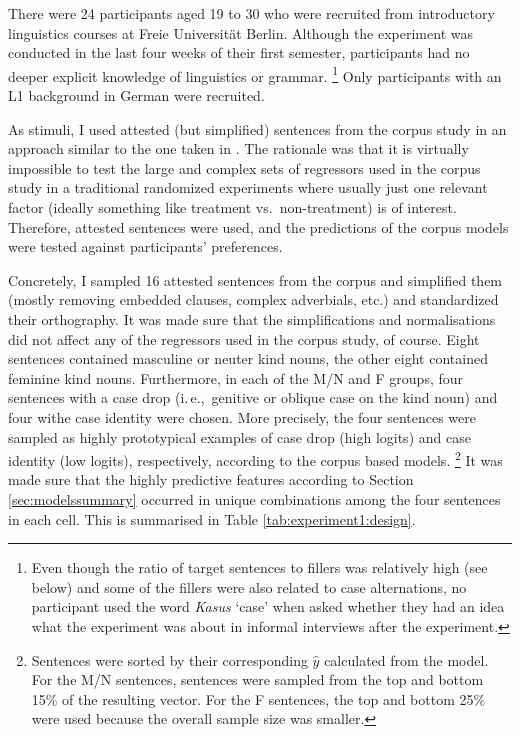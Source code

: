 \documentclass[USenglish]{article}
\newcommand{\ie}{i.\,e.,}
\begin{document}
There were 24 participants aged 19 to 30 who were recruited from introductory linguistics courses at Freie Universität Berlin.
Although the experiment was conducted in the last four weeks of their first semester, participants had no deeper explicit knowledge of linguistics or grammar.%
\footnote{Even though the ratio of target sentences to fillers was relatively high (see below) and some of the fillers were also related to case alternations, no participant used the word \textit{Kasus} `case' when asked whether they had an idea what the experiment was about in informal interviews after the experiment.}
Only participants with an L1 background in German were recruited.

As stimuli, I used attested (but simplified) sentences from the corpus study in an approach similar to the one taken in \cite{DivjakEa2016}.
The rationale was that it is virtually impossible to test the large and complex sets of regressors used in the corpus study in a traditional randomized experiments where usually just one relevant factor (ideally something like treatment vs.\ non-treatment) is of interest.
Therefore, attested sentences were used, and the predictions of the corpus models were tested against participants' preferences.

Concretely, I sampled 16 attested sentences from the corpus and simplified them (mostly removing embedded clauses, complex adverbials, etc.) and standardized their orthography.
It was made sure that the simplifications and normalisations did not affect any of the regressors used in the corpus study, of course.
Eight sentences contained masculine or neuter kind nouns, the other eight contained feminine kind nouns.
Furthermore, in each of the M\slash N and F groups, four sentences with a case drop (\ie\ genitive or oblique case on the kind noun) and four withe case identity were chosen.
More precisely, the four sentences were sampled as highly prototypical examples of case drop (high logits) and case identity (low logits), respectively, according to the corpus based models.%
\footnote{Sentences were sorted by their corresponding $\hat{y}$ calculated from the model.
For the M\slash N sentences, sentences were sampled from the top and bottom 15\% of the resulting vector.
For the F sentences, the top and bottom 25\% were used because the overall sample size was smaller.}
It was made sure that the highly predictive features according to Section \ref{sec:modelssummary} occurred in unique combinations among the four sentences in each cell.
This is summarised in Table \ref{tab:experiment1:design}.
\end{document}
